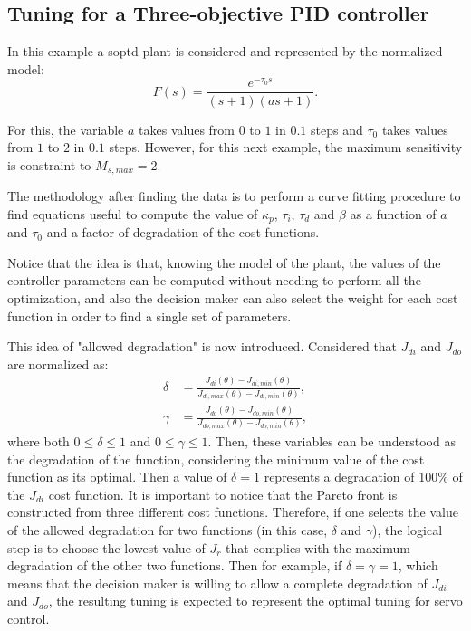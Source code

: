 \subsection{Tuning for a Three-objective PID controller}
\label{sec:Tuning3PID}
In this example a \gls{soptd} plant is considered and represented by the normalized model:
\begin{equation}
	F(s) = \frac{e^{-\tau_{0} s}}{(s+1)(a s+1)}.
	\label{eq:Fs2ordenModeloChap7}
\end{equation}

For this, the variable $a$ takes values from $0$ to $1$ in $0.1$ steps and $\tau_0$ takes values from $1$ to $2$ in $0.1$ steps. However, for this next example, the maximum sensitivity is constraint to $M_{s,max}=2$.

The methodology after finding the data is to perform a curve fitting procedure to find equations useful to compute the value of $\kappa_p$, $\tau_i$, $\tau_d$ and $\beta$ as a function of $a$ and $\tau_0$ and a factor of degradation of the cost functions.

Notice that the idea is that, knowing the model of the plant, the values of the controller parameters can be computed without needing to perform all the optimization, and also the decision maker can also select the weight for each cost function in order to find a single set of parameters.

This idea of "allowed degradation" is now introduced. Considered that $J_{di}$ and $J_{do}$ are normalized as:
%
\begin{align}
\delta &= \frac{J_{di}(\theta)-J_{di, min}(\theta)}{J_{di,max}(\theta)-J_{di,min}(\theta)},\label{eq:delta}\\
\gamma &= \frac{J_{do}(\theta)-J_{do, min}(\theta)}{J_{do,max}(\theta)-J_{do,min}(\theta)},\label{eq:gamma}
\end{align}
%
where both $0 \le \delta \le 1$ and $0 \le \gamma \le 1$. Then, these variables can be understood as the degradation of the function, considering the minimum value of the cost function as its optimal. Then a value of $\delta=1$ represents a degradation of 100\% of the $J_{di}$ cost function. It is important to notice that the Pareto front is constructed from three different cost functions. Therefore, if one selects the value of the allowed degradation for two functions (in this case, $\delta$ and $\gamma$), the logical step is to choose the lowest value of $J_r$ that complies with the maximum degradation of the other two functions. Then for example,  if $\delta=\gamma=1$, which means that the decision maker is willing to allow a complete degradation of $J_{di}$ and $J_{do}$, the resulting tuning is expected to represent the optimal tuning for servo control.

